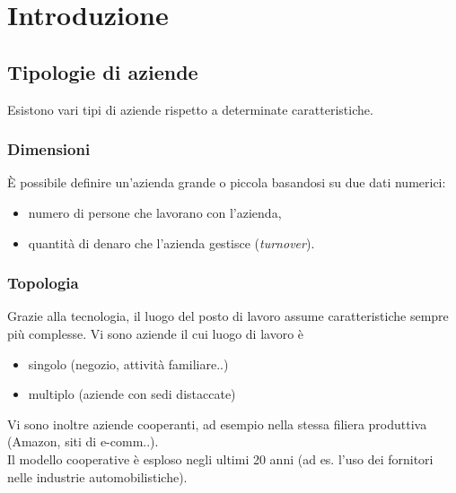 \chapter{Introduzione}
\section{Tipologie di aziende}
Esistono vari tipi di aziende rispetto a determinate caratteristiche.
\subsection{Dimensioni}
\`E possibile definire un'azienda grande o piccola basandosi su due dati numerici:
\begin{itemize}
\item numero di persone che lavorano con l'azienda,
\item quantit\`a di denaro che l'azienda gestisce (\textit{turnover}).
\end{itemize}
\subsection{Topologia}
Grazie alla tecnologia, il luogo del posto di lavoro assume caratteristiche sempre pi\`u complesse.
Vi sono aziende il cui luogo di lavoro \`e
\begin{itemize}
\item singolo (negozio, attivit\`a familiare..)
\item multiplo (aziende con sedi distaccate)
\end{itemize}
Vi sono inoltre aziende cooperanti, ad esempio nella stessa filiera produttiva (Amazon, siti di e-comm..). \\
Il modello cooperative \`e esploso negli ultimi 20 anni (ad es. l'uso dei fornitori nelle industrie automobilistiche).

